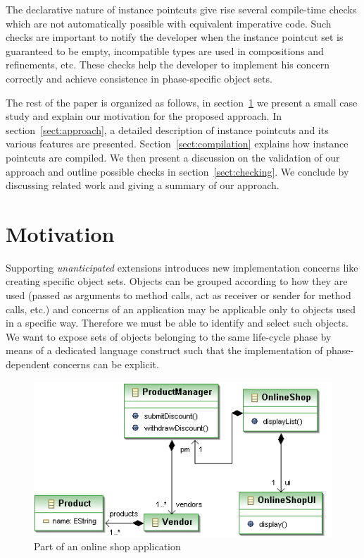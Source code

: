 The declarative nature of instance pointcuts give rise several compile-time checks which are not automatically possible with equivalent imperative code. 
Such checks are important to notify the developer when the instance pointcut set is guaranteed to be empty, incompatible types are used  in compositions and refinements, etc.  These checks help the developer to implement his concern correctly and achieve consistence in phase-specific object sets. 


The rest of the paper is organized as follows, in section~\ref{sect:motivation} we present a small case study and explain our motivation for the proposed approach. In section~\ref{sect:approach}, a detailed description of instance pointcuts and its various features are presented. Section~\ref{sect:compilation} explains how instance pointcuts are compiled. We then present a discussion on the validation of our approach and outline possible checks in section~\ref{sect:checking}. We conclude by discussing related work and giving a summary of our approach.


\section{Motivation}
\label{sect:motivation}
Supporting \emph{unanticipated} extensions introduces new implementation concerns like creating specific object sets.
Objects can be grouped according to how they are used (passed as arguments to method calls, act as receiver or sender for method calls, etc.) and concerns of an application may be applicable only to objects used in a specific way.
Therefore we must be able to identify and select such objects.
We want to expose sets of objects belonging to the same life-cycle phase by means of a dedicated language construct such that the implementation of phase-dependent concerns can be explicit.

\begin{figure}
\centering
\includegraphics[width=\columnwidth]{images/onlineshop2crop.png}%
\vspace{10pt}
\caption{Part of an online shop application}%
\label{fig:shop}%
\end{figure}

